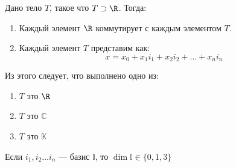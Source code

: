 \begin{theorem}[Фробениуса]
    Дано тело \(T\), такое что \(T \supset \R\). Тогда:
    \begin{enumerate}
        \item Каждый элемент \(\R\) коммутирует с каждым элементом \(T\).
        \item Каждый элемент \(T\) представим как:
              \[x = x_0 + x_1 i_1 + x_2 i_2 + \dots + x_n i_n\]
    \end{enumerate}
\end{theorem}

Из этого следует, что выполнено одно из:
\begin{enumerate}
    \item \(T\) это \(\R\)
    \item \(T\) это \(\mathbb{C}\)
    \item \(T\) это \(\mathbb{K}\)
\end{enumerate}

Если \(i_1, i_2 \dots i_n\) --- базис \(\mathbb{I}\), то \(\dim \mathbb{I} \in \{0, 1, 3\}\)
